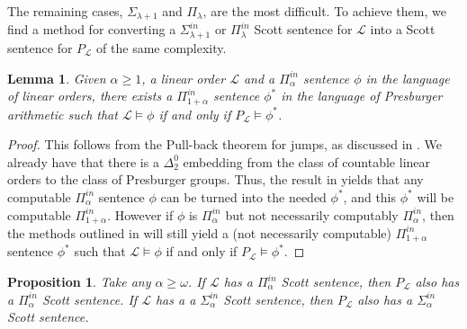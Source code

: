 \documentclass{amsart}%
\numberwithin{theorem}{section}
\newtheorem{lemma}[theorem]{Lemma}
\newtheorem{proposition}[theorem]{Proposition}
\newcommand{\0}{\emptyset}
\newcommand{\LL}{\mathcal{L}}
\begin{document}
The remaining cases, $\Sigma_{\lambda +1 }$ and $\Pi_\lambda$, are the most difficult. To achieve them, we find a method for converting a $\Sigma_{\lambda +1}^{in}$ or $\Pi^{in}_\lambda$ Scott sentence for $\LL$ into a Scott sentence for $P_\LL$ of the same complexity.

\begin{lemma}
\label{pull back}
    Given $\alpha\geq 1$, a linear order $\LL$ and a $\Pi_\alpha^{in} $ sentence $\phi$ in the language of linear orders, there exists a $\Pi_{1+\alpha}^{in}$ sentence $\phi^*$ in the language of Presburger arithmetic such that $\LL\models \phi$ if and only if $P_\LL\models \phi^*$. 
\end{lemma}

\begin{proof}
    This follows from the Pull-back theorem for jumps, as discussed in \cite{Maher2009}. We already have that there is a $\Delta^0_2$ embedding from the class of countable linear orders to the class of Presburger groups. Thus, the result in \cite{Maher2009} yields that any computable $\Pi_{\alpha}^{in}$ sentence $\phi$ can be turned into the needed $\phi^*$, and this $\phi^*$ will be computable $\Pi_{1+\alpha}^{in}$. However if $\phi$ is $\Pi_{\alpha}^{in}$ but not necessarily computably $\Pi_{\alpha}^{in}$, then the methods outlined in \cite{Maher2009} will still yield a (not necessarily computable) $\Pi_{1+\alpha}^{in}$ sentence $\phi^*$ such that $\LL\models \phi$ if and only if $P_\LL\models \phi^*$. 
\end{proof}



\begin{proposition}
\label{limit scott sentences transfer}
    Take any $\alpha\geq \omega$. If $\LL$ has a $\Pi^{in}_\alpha$ Scott sentence, then $P_\LL$ also has a $\Pi^{in}_\alpha$ Scott sentence. If $\LL$ has a a $\Sigma^{in}_\alpha$ Scott sentence, then $P_\LL$ also has a $\Sigma^{in}_\alpha$ Scott sentence.
\end{proposition}
\end{document}
